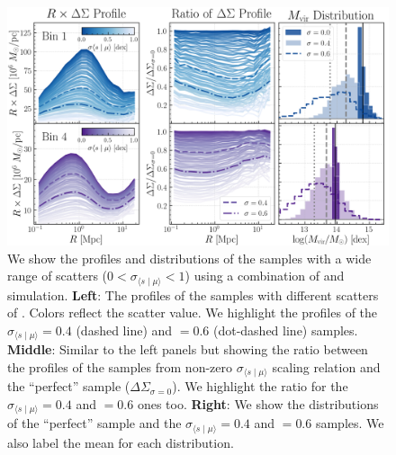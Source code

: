 \documentclass[fleqn,usenatbib,useAMS,english]{mnras}
\begin{document}

    \begin{figure}
        \centering
        \includegraphics[width=16cm]{figure/topn_fig_5}
        \caption{
        We show the \dsigma{} profiles and \mhalo{} distributions of the \topn{} samples with
        a wide range of \mhalo{} scatters ($0<\sigma_{\langle s \mid \mu\rangle}<1$) using a
        combination of  and \smdpl{} simulation.
        \textbf{Left}:
            The \rdsigma{} profiles of the \topn{} samples with different scatters of \mhalo{}.
            Colors reflect the scatter value. We highlight the profiles of the
            $\sigma_{\langle s \mid \mu\rangle}=0.4$ (dashed line) and $=0.6$ (dot-dashed line)
            samples.
        \textbf{Middle}:
            Similar to the left panels but showing the ratio between the \dsigma{} profiles of
            the \topn{} samples from non-zero $\sigma_{\langle s \mid \mu\rangle}$ scaling
            relation and the ``perfect'' sample ($\Delta\Sigma_{\sigma=0}$).
            We highlight the ratio for the $\sigma_{\langle s \mid \mu\rangle}=0.4$ and $=0.6$
            ones too.
        \textbf{Right}:
            We show the \mhalo{} distributions of the ``perfect'' \topn{} sample and the
            $\sigma_{\langle s \mid \mu\rangle}=0.4$ and $=0.6$ samples.
            We also label the mean \mhalo{} for each distribution.
        }
        \label{fig:mdpl2}
    \end{figure}
\end{document}
